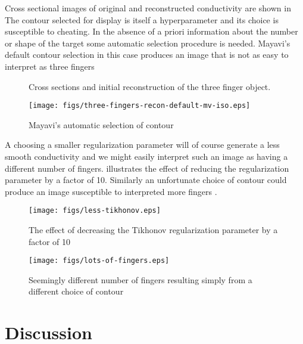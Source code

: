 \documentclass[12pt]{iopart}
\begin{document}
Cross sectional images of original and reconstructed
conductivity are shown in 
The contour selected for display is itself a
hyperparameter and its choice is susceptible to
cheating. In the absence of a priori information about
the number or shape of the target some automatic selection
procedure is needed. Mayavi's default contour selection
in this case produces an image that is not as easy to
interpret as three fingers 

%
%
\begin{figure}[th]

\caption{\label{fig:3fingersXsect}
Cross sections and initial reconstruction of the three finger object.}
\end{figure}

%
%
\begin{figure}[th]
\texttt{[image: figs/three-fingers-recon-default-mv-iso.eps]}
\caption{\label{fig:3fingersMVdefault}
Mayavi's automatic selection of contour}
\end{figure}
A choosing a smaller regularization parameter will of
course generate a less smooth conductivity and we might
easily interpret such an image as having a different number
of fingers.
 illustrates the effect of
reducing the regularization parameter by a factor of
10. Similarly an unfortunate choice of contour could
produce an image susceptible to interpreted more fingers
.
\begin{figure}[th]
\texttt{[image: figs/less-tikhonov.eps]}
\caption{\label{fig:3fingersLessTik}
The effect of decreasing the Tikhonov regularization parameter
 by a factor of 10}
\end{figure}
\begin{figure}[th]
\texttt{[image: figs/lots-of-fingers.eps]}
\caption{\label{fig:3fingersMoreFingers}
Seemingly different number of fingers resulting simply from a
 different choice of contour}
\end{figure}







\section{
 Discussion
}
\end{document}
